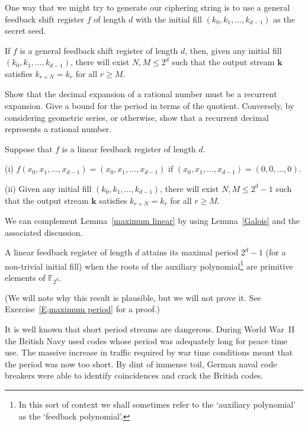 One way that we might try to generate
our ciphering string is to use a general
feedback shift register $f$ of length $d$
with the initial fill $(k_{0},k_{1},\dots,k_{d-1})$
as the secret seed.
\begin{lemma} If $f$ is a general
feedback shift register of length
$d$, then, given any
initial fill $(k_{0},k_{1},\dots,k_{d-1})$,
there will exist $N,M\leq 2^{d}$
such that the output stream ${\mathbf k}$
satisfies $k_{r+N}=k_{r}$ for all $r\geq M$.
\end{lemma}
\begin{exercise}\label{E;rational} 
Show that the decimal expansion of
a rational number must be a recurrent expansion.
Give a bound for the period in terms of the quotient.
Conversely, by considering geometric series, or otherwise,
show that a recurrent decimal represents
a rational number.
\end{exercise}
\begin{lemma}\label{maximum linear}
Suppose that $f$ is a linear
feedback register of length $d$.

(i) $f(x_{0},x_{1},\dots,x_{d-1})=(x_{0},x_{1},\dots,x_{d-1})$
if $(x_{0},x_{1},\dots,x_{d-1})=(0,0,\dots,0)$.

(ii) Given any
initial fill $(k_{0},k_{1},\dots,k_{d-1})$,
there will exist $N,M\leq 2^{d}-1$
such that the output stream ${\mathbf k}$
satisfies $k_{r+N}=k_{r}$ for all $r\geq M$.
\end{lemma}
We can complement Lemma~\ref{maximum linear}
by using Lemma~\ref{Galois} and the associated
discussion.
\begin{lemma}\label{L;period bound}
A linear feedback register of length
$d$ attains its maximal period $2^{d}-1$
(for a non-trivial initial fill)
when the roots of the auxiliary polynomial\footnote{In
this sort of context we shall sometimes refer
to the `auxiliary polynomial' as the `feedback polynomial'.} 
are primitive elements of ${\mathbb F}_{2^{d}}$.
\end{lemma}
\noindent
(We will note why this result is plausible, but
we will not prove it. See Exercise~\ref{E;maximum period}
for a proof.)


It is well known that short period streams are dangerous.
During World War~II the British Navy used codes
whose period was adequately long for peace time use.
The massive increase in traffic required by
war time conditions meant that the period was
now too short. By dint of immense toil, German naval
code breakers were able to identify coincidences
and crack the British codes.

